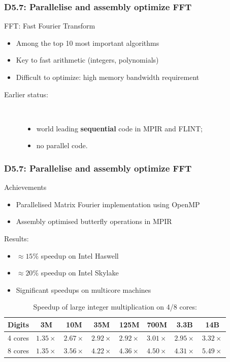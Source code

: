 \documentclass{beamer}
\begin{document}
\begin{frame}
  \frametitle{D5.7: Parallelise and assembly optimize FFT}

  \begin{block}    {FFT: Fast Fourier Transform}
    \begin{itemize}
    \item Among the top 10 most important algorithms
    \item Key to fast arithmetic (integers, polynomials)
    \item Difficult to optimize: high memory bandwidth requirement
    \end{itemize}
    \begin{description}
    \item[Earlier status:]\
      \begin{itemize}
      \item world leading \textbf{sequential} code in MPIR and FLINT;
      \item no parallel code.
        \end{itemize}
    \end{description}
  \end{block}
\end{frame}
\begin{frame}
  \frametitle{D5.7: Parallelise and assembly optimize FFT}
  \begin{block} {Achievements}
  \begin{itemize}
\item Parallelised Matrix Fourier implementation using OpenMP
\item Assembly optimised butterfly operations in MPIR
\end{itemize}
  \end{block}

\begin{block}{Results:}

\begin{itemize}
\item $\approx 15\%$ speedup  on Intel Haswell
\item $\approx 20\%$ speedup on Intel Skylake
\item Significant speedups on multicore machines
\end{itemize}
\end{block}

\vspace{-1em}
\begin{table}
  \caption{Speedup of large integer multiplication on 4/8 cores:}
  \begin{tabular}{cccccccc}
  \toprule
{Digits} & 3M & 10M & 35M & 125M & 700M & 3.3B & 14B\\
\midrule
    {4 cores} & $1.35\times$ & $2.67\times$ & $2.92\times$ & $2.92\times$ & $3.01\times$ & $2.95\times$ & $3.32\times$ \\
{8 cores} & $1.35\times$ & $3.56\times$ & $4.22\times$ & $4.36\times$ & $4.50\times$ & $4.31\times$ & $5.49\times$\\
\bottomrule
\end{tabular}
\end{table}
\end{frame}
\end{document}
